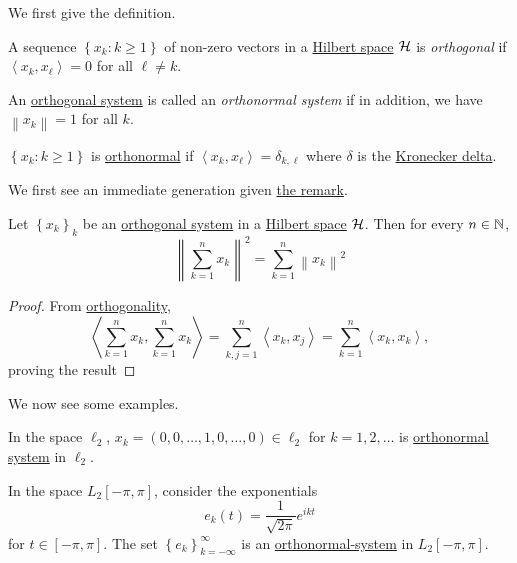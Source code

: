 We first give the definition.

\begin{definition}\label{def:orthogonal-system}
	A sequence \(\left\{ x_{k} \colon k\geq 1 \right\} \) of non-zero vectors in a \hyperref[def:Hilbert-space]{Hilbert space} \(\mathcal{\MakeUppercase{h}} \) is \emph{orthogonal} if \(\left\langle x_{k} , x_{\ell} \right\rangle = 0\) for all \(\ell \neq k\).
\end{definition}

\begin{definition}\label{def:orthonormal-system}
	An \hyperref[def:orthogonal-system]{orthogonal system} is called an \emph{orthonormal system} if in addition, we have \(\left\lVert x_{k} \right\rVert= 1 \) for all \(k\).
\end{definition}

\begin{remark}
	\(\left\{ x_{k} \colon k\geq 1 \right\} \) is \hyperref[def:orthonormal-system]{orthonormal} if \(\left\langle x_{k} , x_{\ell } \right\rangle = \delta _{k, \ell } \) where \(\delta \) is the \href{https://en.wikipedia.org/wiki/Kronecker_delta}{Kronecker delta}.
\end{remark}

We first see an immediate generation given \hyperref[rmk:Pythagorean-theorem]{the remark}.
\begin{theorem}\label{thm:Pythagorean-theorem}
	Let \(\left\{ x_k \right\} _k\) be an \hyperref[def:orthogonal-system]{orthogonal system} in a \hyperref[def:Hilbert-space]{Hilbert space} \(\mathcal{\MakeUppercase{h}} \). Then for every \(n \in \mathbb{\MakeUppercase{n}}\),
	\[
		\left\lVert \sum_{k=1} ^n x_k\right\rVert ^{2} = \sum_{k=1} ^n \left\lVert x_k\right\rVert ^{2}
	\]
\end{theorem}
\begin{proof}
	From \hyperref[def:orthogonal]{orthogonality},
	\[
		\left\langle \sum_{k=1} ^n x_k, \sum_{k=1} ^n x_k \right\rangle = \sum_{k, j= 1}^n \left\langle x_k, x_j \right\rangle  = \sum_{k=1} ^n \left\langle x_k, x_k \right\rangle,
	\]
	proving the result
\end{proof}

We now see some examples.

\begin{eg}
	In the space \(\ell _2\), \(x_{k} = (0, 0, \ldots , 1 , 0, \ldots , 0 )\in \ell _2\) for \(k = 1, 2, \ldots\) is \hyperref[def:orthonormal-system]{orthonormal system} in \(\ell _2\).
\end{eg}
\begin{eg}
	In the space \(L_2[-\pi , \pi ]\), consider the exponentials
	\[
		e_k (t) = \frac{1}{\sqrt{2\pi } }e^{ikt}
	\]
	for \(t\in [-\pi , \pi ]\). The set \(\left\{ e_k \right\} _{k=-\infty }^{\infty} \) is an \hyperref[def:orthonormal-system]{orthonormal-system} in \(L_2[-\pi , \pi ]\).
\end{eg}

